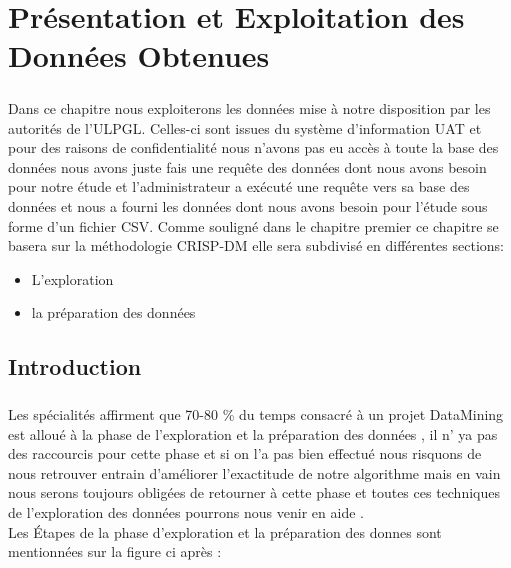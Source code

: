 \chapter{Présentation et Exploitation des Données Obtenues}
\paragraph{}
 Dans ce chapitre nous exploiterons  les données mise à notre
disposition par les autorités de l'\ac{ULPGL}. Celles-ci sont issues du
système d'information \ac{UAT}  et pour des
raisons de confidentialité nous n'avons pas eu accès à toute la base des
données nous avons juste fais une requête des données dont nous avons
besoin pour notre étude et l'administrateur a exécuté une requête vers
sa base des données et nous a fourni les données dont nous avons besoin
pour l'étude sous forme d'un fichier \ac {CSV}. Comme
souligné dans le chapitre premier ce chapitre se basera sur la
méthodologie \ac{CRISP-DM} elle sera subdivisé en différentes sections:
\begin{itemize}
	\item L'exploration 
	\item la préparation des données \cite{bookSckit-Learn}
\end{itemize}
\section{Introduction}
\paragraph{}
Les spécialités affirment que 70-80 \% du temps consacré à un projet
DataMining est alloué à la phase de l'exploration et la préparation des
données \cite{DataExpAV} , il n' ya pas des raccourcis pour cette phase et si on l'a pas
bien effectué nous risquons de nous retrouver entrain d'améliorer
l'exactitude de notre algorithme mais en vain nous serons toujours
obligées de retourner à cette phase et toutes ces techniques de
l'exploration des données pourrons nous venir en aide .\\
Les Étapes de la phase d'exploration et la préparation des donnes sont mentionnées sur la figure ci après :
